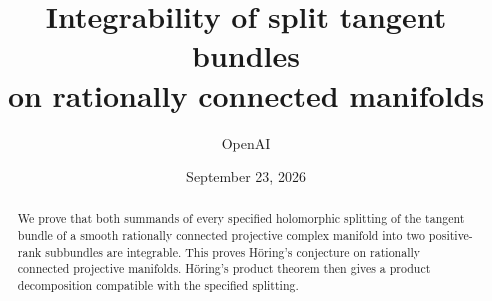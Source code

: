 \documentclass[11pt]{article}
\title{Integrability of split tangent bundles\\
on rationally connected manifolds}
\author{OpenAI}
\date{September 23, 2026}
\theoremstyle{remark}
\numberwithin{equation}{section}
\begin{document}
\maketitle

\begin{abstract}
We prove that both summands of every specified holomorphic splitting of the
tangent bundle of a smooth rationally connected projective complex manifold
into two positive-rank subbundles are integrable. This proves H\"oring's
conjecture on rationally connected projective manifolds. H\"oring's product
theorem then gives a product decomposition compatible with the specified
splitting.
\end{abstract}






\appendix



\end{document}
